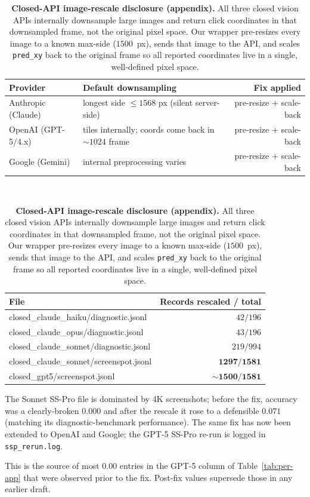 \begin{table}[t]
\centering
\small
\begin{threeparttable}
\caption{\textbf{Closed-API image-rescale disclosure (appendix).}
All three closed vision APIs internally downsample large images and
return click coordinates in that downsampled frame, not the original
pixel space. Our wrapper pre-resizes every image to a known
max-side ($1500$~px), sends that image to the API, and scales
\texttt{pred\_xy} back to the original frame so all reported
coordinates live in a single, well-defined pixel space.}
\label{tab:anthropic-rescale}
\begin{tabular}{@{}llr@{}}
\toprule
\textbf{Provider} & \textbf{Default downsampling} & \textbf{Fix applied} \\
\midrule
Anthropic (Claude)   & longest side $\le 1568$ px (silent server-side)        & pre-resize + scale-back \\
OpenAI (GPT-5/4.x)   & tiles internally; coords come back in $\sim 1024$ frame & pre-resize + scale-back \\
Google (Gemini)      & internal preprocessing varies                          & pre-resize + scale-back \\
\bottomrule
\end{tabular}
\\[6pt]
\begin{tabular}{@{}lr@{}}
\toprule
\textbf{File} & \textbf{Records rescaled / total} \\
\midrule
closed\_claude\_haiku/diagnostic.jsonl   &  $42 / 196$ \\
closed\_claude\_opus/diagnostic.jsonl    &  $43 / 196$ \\
closed\_claude\_sonnet/diagnostic.jsonl  & $219 / 994$ \\
closed\_claude\_sonnet/screenspot.jsonl  & $\mathbf{1297 / 1581}$ \\
closed\_gpt5/screenspot.jsonl            & $\mathbf{\sim\!1500 / 1581}$ \\
\bottomrule
\end{tabular}
\begin{tablenotes}
\footnotesize
\item The Sonnet SS-Pro file is dominated by 4K screenshots; before
the fix, accuracy was a clearly-broken $0.000$ and after the rescale
it rose to a defensible $0.071$ (matching its diagnostic-benchmark
performance). The same fix has now been extended to OpenAI and
Google; the GPT-5 SS-Pro re-run is logged in
\texttt{ssp\_rerun.log}.
\item This is the source of most $0.00$ entries in the GPT-5 column
of Table~\ref{tab:per-app} that were observed prior to the fix.
Post-fix values supersede those in any earlier draft.
\end{tablenotes}
\end{threeparttable}
\end{table}


